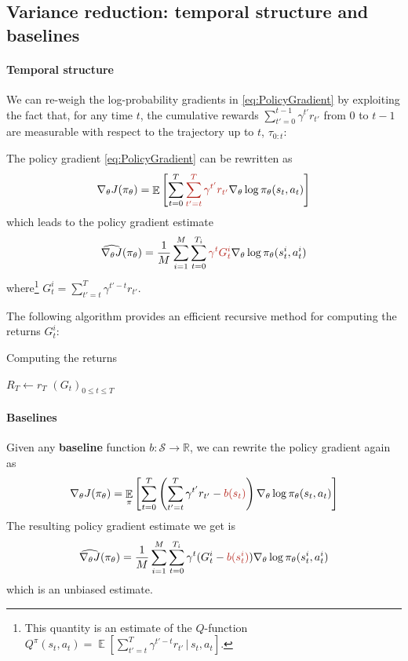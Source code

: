 \documentclass[12pt]{report}
\newcommand\RR{\mathbb{R}}
\DeclareMathOperator{\EE}{\mathbb{E}}
\newcommand{\calS}{\mathcal{S}}
\newcommand{\redfont}{\color{darkred}}
\newcommand{\bluefont}{\color{Blue}}
\begin{document}
\subsection{Variance reduction: temporal structure and baselines}

\paragraph{Temporal structure} We can re-weigh the log-probability gradients in \cref{eq:PolicyGradient} by exploiting the fact that, for any time $t$, the cumulative rewards $\sum_{t'=0}^{t-1} \gamma^{t'} r_{t'}$ from $0$ to $t-1$ are measurable with respect to the trajectory up to $t$, $\tau_{0:t}$:
\begin{prop}
The policy gradient \eqref{eq:PolicyGradient} can be rewritten as
\begin{equation}
\nabla_\theta J(\pi_\theta) =
\EE\left[
	\sum_{t=0}^T
	{\redfont
		\sum_{t'=t}^T \gamma^{t'} r_{t'}
	}
	\nabla_\theta \log\pi_\theta(s_t,a_t)
\right]
\end{equation}
which leads to the policy gradient estimate
\begin{equation}
	\widehat{\nabla_\theta J}(\pi_\theta) =
	\frac{1}{M}\sum_{i=1}^M
	\sum_{t=0}^{T_i}
	{\redfont \gamma^t G^i_t}
	\nabla_\theta \log\pi_\theta (s_t^i, a_t^i)
\end{equation}
where\footnote{This quantity is an estimate of the $Q$-function $Q^\pi(s_t, a_t) = \EE [\sum_{t'=t}^T \gamma^{t'-t} r_{t'} \,|\, s_{t}, a_{t} ]$.} $G^i_t = \sum_{t'=t}^T \gamma^{t'-t}r_{t'}$.
\end{prop}


The following algorithm provides an efficient recursive method for computing the returns $G^i_t$:

\begin{algorithm}
	\caption{Computing the returns}\label{algo:ComputeReturnsEfficient}
	$R_T \leftarrow r_T$\;
	\Return $(G_t)_{0\leq t\leq T}$\;
\end{algorithm}


\paragraph{Baselines} Given any \textbf{\bluefont baseline} function $b\colon \calS \to \RR$, we can rewrite the policy gradient again as
\begin{equation}
	\nabla_\theta J(\pi_\theta) =
	\EE_\pi \left[
	\sum_{t=0}^T
	\left(
		\sum_{t'=t}^T \gamma^{t'} r_{t'} - {\redfont b(s_t)}
	\right)
	\nabla_\theta \log\pi_\theta(s_t, a_t)
	\right]
\end{equation}
The resulting policy gradient estimate we get is
\begin{equation}\label{eq:MCPolicyGradBaseline}
	\widehat{\nabla_\theta J}(\pi_\theta) =
	\frac{1}{M}\sum_{i=1}^M
	\sum_{t=0}^{T_i}
	\gamma^t (G^i_t - {\redfont b(s^i_t)})
	\nabla_\theta \log\pi_\theta (s_t^i, a_t^i)
\end{equation}
which is an unbiased estimate.
\end{document}
